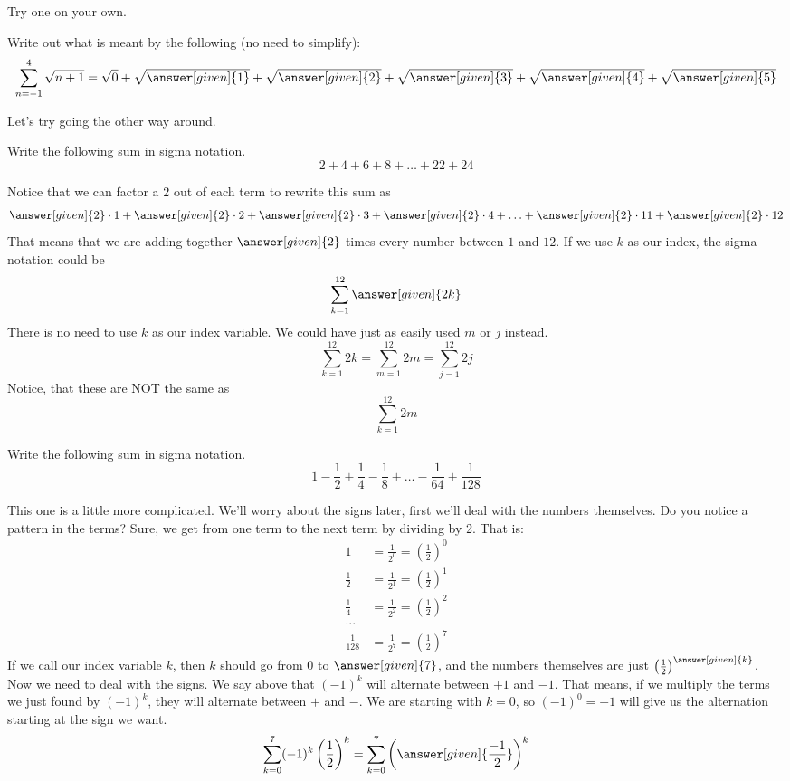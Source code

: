 \documentclass[12pt]{ximera}
\begin{document}
Try one on your own.
\begin{question}
	Write out what is meant by the following (no need to simplify):
	\[ \sum_{n=-1}^{4} \sqrt{n+1} =\sqrt{0}+\sqrt{\answer[given]{1}}+\sqrt{\answer[given]{2}}+\sqrt{\answer[given]{3}}+\sqrt{\answer[given]{4}}+\sqrt{\answer[given]{5}}\]
\end{question}


Let's try going the other way around.
\begin{example}
	Write the following sum in sigma notation.
	\[ 2 + 4 + 6 + 8 + \ldots + 22 + 24 \]
	\begin{explanation}
		Notice that we can factor a $2$ out of each term to rewrite this sum as
		\[ \answer[given]{2}\cdot 1 + \answer[given]{2} \cdot 2 + \answer[given]{2}\cdot 3 + \answer[given]{2} \cdot 4 + \ldots + \answer[given]{2}\cdot 11 + \answer[given]{2}\cdot 12 \]
		That means that we are adding together $\answer[given]{2}$ times every number between $1$ and $12$.  If we use $k$ as our index, the sigma notation could be
		\[ \sum_{k=1}^{12} \answer[given]{2k} \]
		There is no need to use $k$ as our index variable.  We could have just as easily used $m$ or $j$ instead.
		\[ \sum_{k=1}^{12} 2k = \sum_{m=1}^{12} 2m = \sum_{j=1}^{12} 2j\]  
		Notice, that these are NOT the same as
		\[ \sum_{k=1}^{12} 2m \]
	\end{explanation}
\end{example}


\begin{example}
	Write the following sum in sigma notation.
	\[ 1 - \frac{1}{2} + \frac{1}{4} - \frac{1}{8} + \ldots - \frac{1}{64} + \frac{1}{128}  \]
	\begin{explanation}
		This one is a little more complicated.  We'll worry about the signs later, first we'll deal with the numbers themselves.  Do you notice a pattern in the terms?
		Sure, we get from one term to the next term by dividing by 2.  That is:
		\begin{align*}
			1 &= \frac{1}{2^0} = \left(\frac{1}{2}\right)^0\\
			\frac{1}{2} &= \frac{1}{2^1} = \left(\frac{1}{2}\right)^{1}\\
			\frac{1}{4} &= \frac{1}{2^2} = \left(\frac{1}{2}\right)^{2}\\
				 ...  \\
			 \frac{1}{128} &= \frac{1}{2^7} = \left(\frac{1}{2}\right)^{7}
		\end{align*}
		If we call our index variable $k$, then $k$ should go from $0$ to $\answer[given]{7}$, and the numbers themselves are just $\left(\frac{1}{2}\right)^{\answer[given]{k}}$.  Now we need to deal with the signs.
		We say above that $(-1)^k$ will alternate between $+1$ and $-1$.  That means, if we multiply the terms we just found by $(-1)^k$, they will alternate between $+$ and $-$.  
		We are starting with $k=0$, so $(-1)^0 = +1$ will give us the alternation starting at the sign we want.
		\[ \sum_{k=0}^{7} (-1)^k \left(\frac{1}{2}\right)^{k} = \sum_{k=0}^7 \left( \answer[given]{\frac{-1}{2}} \right)^k \]
	\end{explanation}
\end{example}
 
\end{document}
